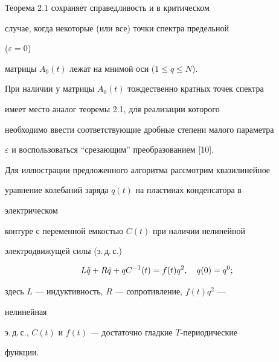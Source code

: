 \setcounter{note}{0} 


 


\begin{notes} 


Теорема 2.1 сохраняет справедливость и в критическом 


случае, когда некоторые (или все) точки спектра предельной 


($\varepsilon=0$) 


матрицы $A_0(t)$ лежат на мнимой оси ($1\le q\le N$). 


\end{notes} 


 


\begin{notes} 


При наличии у матрицы $A_0(t)$ тождественно кратных точек спектра 


имеет место аналог теоремы 2.1, для реализации которого 


необходимо ввести соответствующие дробные степени малого параметра  


$\varepsilon$ и воспользоваться ``срезающим'' преобразованием [10]. 


\end{notes} 


 


Для иллюстрации предложенного алгоритма рассмотрим квазилинейное  


уравнение колебаний заряда $q(t)$ на пластинах конденсатора в 


электрическом 


контуре с переменной емкостью $C(t)$ при наличии нелинейной 


электродвижущей силы (э.\,д.\,с.) 


\begin{equation} 


L\Ddot q+R\Dot q+q C^{-1}(t)=f(t)q^2,\quad 


q(0)=q^0; 


\end{equation} 


здесь $L$ --- индуктивность, $R$ --- сопротивление, $f(t)q^2$ --- 


нелинейная  


э.\,д.\,с., $C(t)$ и $f(t)$ --- достаточно гладкие $T$-периодические 


функции. 


